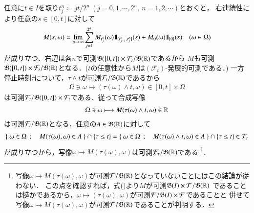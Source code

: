 	\begin{prf}
		任意に$t \in I$を取り$t_j^n \coloneqq jt/2^n\ (j=0,1,\cdots,2^n,\ n=1,2,\cdots)$とおくと，
		右連続性により任意の$s \in [0,t]$に対して
		\begin{align}
			M(s,\omega) = \lim_{n \to \infty} \sum_{j=1}^{2^n} M_{t_j^n}(\omega) \mbox{1}\hspace{-0.25em}\mbox{l}_{(t_{j-1}^n,t_j^n]}(s) + M_0(\omega) \mbox{1}\hspace{-0.25em}\mbox{l}_{\{0\}}(s) \quad (\omega \in \Omega)
			\label{eq:stopping_time_measurability}
		\end{align}
		が成り立つ．右辺は各$n$で可測$\mathfrak{B}([0,t]) \times \mathcal{F}_t/\mathfrak{B}(\mathbb{R})$であるから
		$M$も可測$\mathfrak{B}([0,t]) \times \mathcal{F}_t/\mathfrak{B}(\mathbb{R})$となる．($t$の任意性から$M$は$(\mathcal{F}_t)$-発展的可測である．)
		一方停止時刻$\tau$について，$\tau \wedge t$が可測$\mathcal{F}_t/\mathfrak{B}(\mathbb{R})$であるから
		\begin{align}
			\Omega \ni \omega \longmapsto (\tau(\omega) \wedge t, \omega) \in [0,t] \times \Omega
		\end{align}
		は可測$\mathcal{F}_t/\mathfrak{B}([0,t]) \times \mathcal{F}_t$である．従って合成写像
		\begin{align}
			\Omega \ni \omega \longmapsto M(\tau(\omega) \wedge t,\omega) \in \mathbb{R}
		\end{align}
		は可測$\mathcal{F}_t/\mathfrak{B}(\mathbb{R})$となる．任意の$A \in \mathfrak{B}(\mathbb{R})$に対して
		\begin{align}
			\left\{\ \omega \in \Omega\ \, ; \quad M(\tau(\omega),\omega) \in A\ \right\} \cap \left\{ \tau \leq t \right\}
			= \left\{\ \omega \in \Omega\ \, ; \quad M(\tau(\omega) \wedge t,\omega) \in A\ \right\} \cap \left\{ \tau \leq t \right\}
			\in \mathcal{F}_t
		\end{align}
		が成り立つから，写像$\omega \longmapsto M(\tau(\omega),\omega)$は可測$\mathcal{F}_\tau/\mathfrak{B}(\mathbb{R})$である
		\footnote{
			写像$\omega \longmapsto M(\tau(\omega),\omega)$が可測$\mathcal{F}/\mathfrak{B}(\mathbb{R})$となっていないことにはこの結論が従わない．
			この点を確認すれば，式()より$M$が可測$\mathfrak{B}(I) \times \mathcal{F}/\mathfrak{B}(\mathbb{R})$
			であることは慥かであるから，$\omega \longmapsto (\tau(\omega),\omega)$が可測$\mathcal{F}/\mathfrak{B}(I)\times\mathcal{F}$であることと
			併せて写像$\omega \longmapsto M(\tau(\omega),\omega)$が可測$\mathcal{F}/\mathfrak{B}(\mathbb{R})$であることが判明する．
		}．
		\QED
	\end{prf}
	
